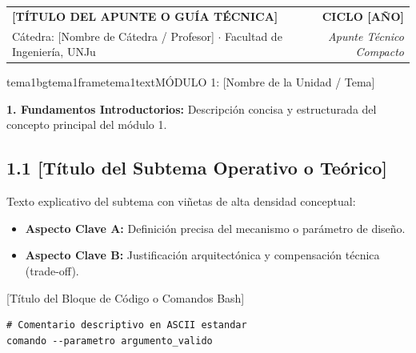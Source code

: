 \documentclass[9pt,a4paper]{extarticle}
\begin{document}
\begin{bannerbox}
    \begin{tabularx}{\linewidth}{@{}Xr@{}}
        \textbf{\fontsize{11.5pt}{13.5pt}\selectfont\color{bannertitle} [TÍTULO DEL APUNTE O GUÍA TÉCNICA]} & \textbf{\fontsize{8pt}{10pt}\selectfont\color{bannerframe} CICLO [AÑO]} \\
        \fontsize{8.2pt}{10.2pt}\selectfont\color{bannerframe!90!black} Cátedra: [Nombre de Cátedra / Profesor] $\cdot$ Facultad de Ingeniería, UNJu & \textit{\fontsize{7.8pt}{9.8pt}\selectfont Apunte Técnico Compacto}
    \end{tabularx}
\end{bannerbox}

\vspace{1pt}

\begin{bloqueheader}{tema1bg}{tema1frame}{tema1text}{MÓDULO 1: [Nombre de la Unidad / Tema]}
\end{bloqueheader}

\textbf{1. Fundamentos Introductorios:}
Descripción concisa y estructurada del concepto principal del módulo 1.

\subsection{1.1 [Título del Subtema Operativo o Teórico]}
Texto explicativo del subtema con viñetas de alta densidad conceptual:
\begin{itemize}[leftmargin=12pt, itemsep=0.5pt, topsep=1pt]
    \item \textbf{Aspecto Clave A:} Definición precisa del mecanismo o parámetro de diseño.
    \item \textbf{Aspecto Clave B:} Justificación arquitectónica y compensación técnica (trade-off).
\end{itemize}

\begin{codebox}{[Título del Bloque de Código o Comandos Bash]}
\begin{lstlisting}[style=bashstyle]
# Comentario descriptivo en ASCII estandar
comando --parametro argumento_valido
\end{lstlisting}
\end{codebox}
\end{document}

